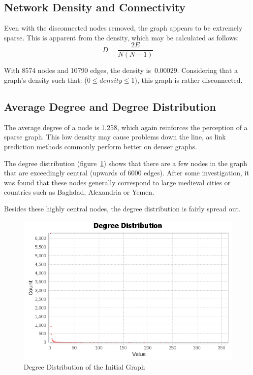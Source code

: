 \subsection{Network Density and Connectivity}\label{subsec:network-density-and-connectivity}


Even with the disconnected nodes removed, the graph appears to be extremely sparse.
This is apparent from the density, which  may be calculated as follows:
\[
    D = \frac{2E}{N(N - 1)}
\]

With 8574 nodes and 10790 edges, the density is $~0.00029$.
Considering that a graph's density such that: ($0 \leq density \leq 1$), this graph is rather disconnected.

\subsection{Average Degree and Degree Distribution}\label{subsec:average-degree-and-degree-distribution}
The average degree of a node is 1.258, which again reinforces the perception of a sparse graph.
This low density may cause problems down the line, as link prediction methods commonly perform better on denser graphs.

The degree distribution (figure~\ref{fig:degree-distribution})
shows that there are a few nodes in the graph that are exceedingly central
(upwards of 6000 edges).
After some investigation,
it was found that these nodes generally correspond to large medieval cities or countries such as Baghdad,
Alexandria or Yemen.

Besides these highly central nodes, the degree distribution is fairly spread out.

\begin{figure}[h] %
    \centering %
    \includegraphics[width=1\linewidth]{figures/degree-distribution/degree-distribution} %
    \caption{Degree Distribution of the Initial Graph} %
    \label{fig:degree-distribution} %
\end{figure}


